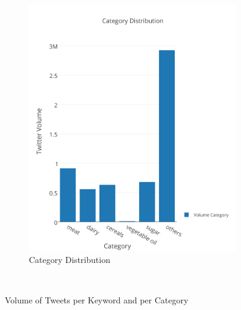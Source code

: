 \begin{figure}[H]
\begin{subfigure}[b]{0.5\textwidth}
                \includegraphics[width=\textwidth]{img/anal/exp_dist_cat}
                \caption{Category Distribution}
                \label{fig:cat}
        \end{subfigure}
        ~ %
      
        \caption{Volume of Tweets per Keyword and per Category}\label{fig:distribution}
\end{figure}





 
